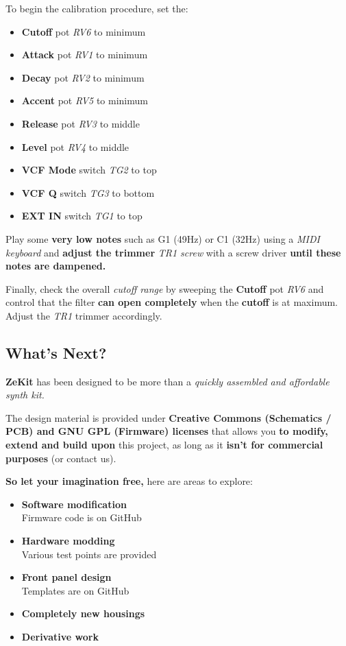 \documentclass{scrartcl}
\begin{document}
To begin the calibration procedure, set the:
\begin{itemize}
    \item \textbf{Cutoff} pot \emph{RV6} to minimum
    \item \textbf{Attack} pot \emph{RV1} to minimum
    \item \textbf{Decay} pot \emph{RV2} to minimum
    \item \textbf{Accent} pot \emph{RV5} to minimum
    \item \textbf{Release} pot \emph{RV3} to middle
    \item \textbf{Level} pot \emph{RV4} to middle
    \item \textbf{VCF Mode} switch \emph{TG2} to top
    \item \textbf{VCF Q} switch \emph{TG3} to bottom
    \item \textbf{EXT IN} switch \emph{TG1} to top
\end{itemize}

\vspace{0.25cm}
Play some \textbf{very low notes} such as G1 (49Hz) or C1 (32Hz) using a \emph{MIDI keyboard} and \textbf{adjust the trimmer} \emph{TR1 screw} with a screw driver \textbf{until these notes are dampened.}

Finally, check the overall \emph{cutoff range} by sweeping the \textbf{Cutoff} pot \emph{RV6} and control that the filter \textbf{can open completely} when the \textbf{cutoff} is at maximum. Adjust the \emph{TR1} trimmer accordingly.

\pagebreak
\subsection{What's Next?}

\textbf{ZeKit} has been designed to be more than a \emph{quickly assembled and affordable synth kit.}

The design material is provided under \textbf{Creative Commons (Schematics / PCB) and GNU GPL (Firmware) licenses} that allows you \textbf{to modify, extend and build upon} this project,
as long as it \textbf{isn't for commercial purposes} (or contact us).

\textbf{So let your imagination free,} here are areas to explore:

\begin{itemize}
    \item \textbf{Software modification} \\
          Firmware code is on GitHub
    \item \textbf{Hardware modding} \\
          Various test points are provided
    \item \textbf{Front panel design} \\
          Templates are on GitHub
    \item \textbf{Completely new housings}
    \item \textbf{Derivative work}
\end{itemize}
\end{document}
